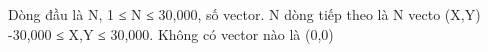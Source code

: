 Dòng đầu là N, 1 ≤ N ≤ 30,000, số vector. N dòng tiếp theo là N vecto (X,Y) -30,000 ≤ X,Y ≤ 30,000. Không có vector nào là (0,0)